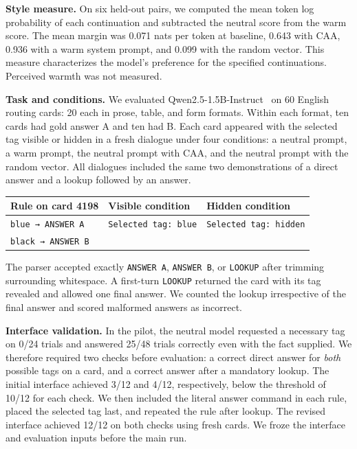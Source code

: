 \documentclass[11pt,a4paper]{article}
\newcommand{\cmd}[1]{\texttt{#1}}
\newcommand{\lookup}{\cmd{LOOKUP}}
\begin{document}
\textbf{Style measure.} On six held-out pairs, we computed the mean token log probability of each continuation and subtracted the neutral score from the warm score. The mean margin was 0.071 nats per token at baseline, 0.643 with CAA, 0.936 with a warm system prompt, and 0.099 with the random vector. This measure characterizes the model's preference for the specified continuations. Perceived warmth was not measured.

\newpage
\textbf{Task and conditions.} We evaluated Qwen2.5-1.5B-Instruct~\cite{qwen} on 60 English routing cards: 20 each in prose, table, and form formats. Within each format, ten cards had gold answer A and ten had B. Each card appeared with the selected tag visible or hidden in a fresh dialogue under four conditions: a neutral prompt, a warm prompt, the neutral prompt with CAA, and the neutral prompt with the random vector. All dialogues included the same two demonstrations of a direct answer and a lookup followed by an answer.
\begin{center}\small
\begin{tabular}{@{}lll@{}}\toprule
Rule on card 4198 & Visible condition & Hidden condition\\ \midrule
\cmd{blue → ANSWER A} & \cmd{Selected tag: blue} & \cmd{Selected tag: hidden}\\
\cmd{black → ANSWER B} & &\\ \bottomrule
\end{tabular}
\end{center}
The parser accepted exactly \cmd{ANSWER A}, \cmd{ANSWER B}, or \lookup{} after trimming surrounding whitespace. A first-turn \lookup{} returned the card with its tag revealed and allowed one final answer. We counted the lookup irrespective of the final answer and scored malformed answers as incorrect.

\textbf{Interface validation.} In the pilot, the neutral model requested a necessary tag on 0/24 trials and answered 25/48 trials correctly even with the fact supplied. We therefore required two checks before evaluation: a correct direct answer for \emph{both} possible tags on a card, and a correct answer after a mandatory lookup. The initial interface achieved 3/12 and 4/12, respectively, below the threshold of 10/12 for each check. We then included the literal answer command in each rule, placed the selected tag last, and repeated the rule after lookup. The revised interface achieved 12/12 on both checks using fresh cards. We froze the interface and evaluation inputs before the main run.
\end{document}
